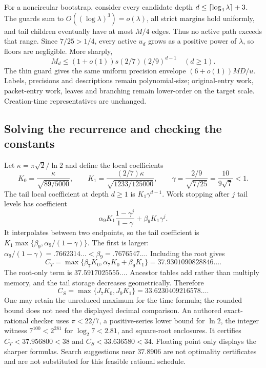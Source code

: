 For a noncircular bootstrap, consider every candidate depth $d\le\left\lceil\log_4\lambda\right\rceil+3$. The guards sum to $O((\log\lambda)^3)=o(\lambda)$, all strict margins hold uniformly, and tail children eventually have at most $M/4$ edges. Thus no active path exceeds that range. Since $7/25>1/4$, every active $u_d$ grows as a positive power of $\lambda$, so floors are negligible. More sharply,
\[
 M_d\le(1+o(1))s(2/7)(2/9)^{d-1}\quad(d\ge1).
\]
The thin guard gives the same uniform precision envelope $(6+o(1))MD/u$. Labels, precisions and descriptions remain polynomial-size; original-entry work, packet-entry work, leaves and branching remain lower-order on the target scale. Creation-time representatives are unchanged.

\subsection{Solving the recurrence and checking the constants}
Let $\kappa=\pi\sqrt2/\ln2$ and define the local coefficients
\[
 K_0=\frac\kappa{\sqrt{89/5000}},\qquad
 K_1=\frac{(2/7)\kappa}{\sqrt{1233/125000}},\qquad
 \gamma=\frac{2/9}{\sqrt{7/25}}=\frac{10}{9\sqrt7}<1.
\]
The tail local coefficient at depth $d\ge1$ is $K_1\gamma^{d-1}$. Work stopping after $j$ tail levels has coefficient
\[
 \alpha_9K_1\frac{1-\gamma^j}{1-\gamma}
       +\beta_9K_1\gamma^j.
\]
It interpolates between two endpoints, so the tail coefficient is
$K_1\max\{\beta_9,\alpha_9/(1-\gamma)\}$. The first is larger:
$\alpha_9/(1-\gamma)=.7662314\ldots<\beta_9=.7676547\ldots$.
Including the root gives
\[
 C_T=\max\{\beta_7K_0,\alpha_7K_0+\beta_9K_1\}
 =37.9301090828846\ldots.
\]
The root-only term is $37.5917025555\ldots$. Ancestor tables add rather than multiply memory, and the tail storage decreases geometrically. Therefore
\[
 C_S=\max\{J_7K_0,J_9K_1\}=33.6230409216578\ldots.
\]
One may retain the unreduced maximum for the time formula; the rounded bound does not need the displayed decimal comparison. An authored exact-rational checker uses $\pi<22/7$, a positive-series lower bound for $\ln2$, the integer witness $7^{100}<2^{281}$ for $\log_2 7<2.81$, and square-root enclosures. It certifies $C_T<37.956800<38$ and $C_S<33.636580<34$. Floating point only displays the sharper formulas. Search suggestions near $37.8906$ are not optimality certificates and are not substituted for this feasible rational schedule.



